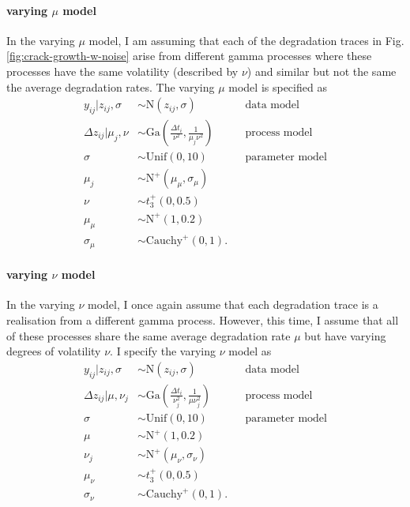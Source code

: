 \paragraph{varying $\mu$ model} In the varying $\mu$ model, I am assuming that each of the degradation traces in Fig.\ref{fig:crack-growth-w-noise} arise from different gamma processes where these processes have the same volatility (described by $\nu$)  and similar but not the same the average degradation rates. The varying $\mu$ model is specified as
\begin{align*} 
   y_{ij}|z_{ij}, \sigma & \sim \mbox{N}(z_{ij}, \sigma)  && \mbox{data model} \\
   \Delta z_{ij}|\mu_j, \nu & \sim \mbox{Ga} \left( \frac{\Delta t_{i}}{\nu^2}, \frac{1}{\mu_j \nu^2} \right) && \mbox{process model} \\
   \sigma & \sim \mbox{Unif}(0, 10) && \mbox{parameter model} \\
   \mu_j & \sim \mbox{N}^{+}(\mu_{\mu}, \sigma_{\mu}) \\
   \nu & \sim t^{+}_3(0, 0.5) \\
   \mu_{\mu} & \sim \mbox{N}^{+}(1, 0.2) \\
   \sigma_{\mu} & \sim \mbox{Cauchy}^{+}(0, 1).
\end{align*}

\paragraph{varying $\nu$ model} In the varying $\nu$ model, I once again assume that each degradation trace is a realisation from a different gamma process. However, this time, I assume that all of these processes share the same average degradation rate $\mu$ but have varying degrees of volatility $\nu$. I specify the varying $\nu$ model as
\begin{align*} 
   y_{ij}|z_{ij}, \sigma & \sim \mbox{N}(z_{ij}, \sigma)  && \mbox{data model} \\
   \Delta z_{ij}|\mu, \nu_j & \sim \mbox{Ga} \left( \frac{\Delta t_{i}}{\nu_j^2}, \frac{1}{\mu \nu_j^2} \right) && \mbox{process model} \\
   \sigma & \sim \mbox{Unif}(0, 10) && \mbox{parameter model} \\
   \mu & \sim \mbox{N}^{+}(1, 0.2) \\
   \nu_j & \sim \mbox{N}^{+}(\mu_{\nu}, \sigma_{\nu}) \\
   \mu_{\nu} & \sim t^{+}_3(0, 0.5) \\
   \sigma_{\nu} & \sim \mbox{Cauchy}^{+}(0, 1).
\end{align*}

